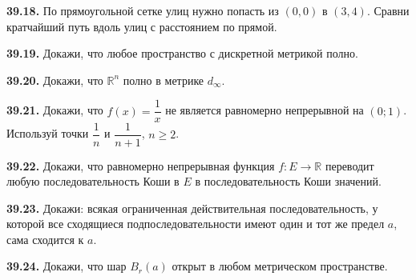 \noindent\begin{minipage}[t]{\linewidth}\textbf{39.18.} По прямоугольной сетке улиц нужно попасть из \((0,0)\) в \((3,4)\). Сравни кратчайший путь вдоль улиц с расстоянием по прямой.\par\end{minipage}\par
\noindent\begin{minipage}[t]{\linewidth}\textbf{39.19.}\starmark{} Докажи, что любое пространство с дискретной метрикой полно.\par\end{minipage}\par
\noindent\begin{minipage}[t]{\linewidth}\textbf{39.20.}\starmark{} Докажи, что \(\mathbb R^n\) полно в метрике \(d_\infty\).\par\end{minipage}\par
\noindent\begin{minipage}[t]{\linewidth}\textbf{39.21.}\starmark{} Докажи, что \(f(x)=\dfrac1x\) не является равномерно непрерывной на \((0;1)\). Используй точки \(\dfrac1n\) и \(\dfrac1{n+1}\), \(n\ge2\).\par\end{minipage}\par
\noindent\begin{minipage}[t]{\linewidth}\textbf{39.22.}\starmark{} Докажи, что равномерно непрерывная функция \(f:E\to\mathbb R\) переводит любую последовательность Коши в \(E\) в последовательность Коши значений.\par\end{minipage}\par
\noindent\begin{minipage}[t]{\linewidth}\textbf{39.23.}\starmark{} Докажи: всякая ограниченная действительная последовательность, у которой все сходящиеся подпоследовательности имеют один и тот же предел \(a\), сама сходится к \(a\).\par\end{minipage}\par
\noindent\begin{minipage}[t]{\linewidth}\textbf{39.24.} Докажи, что шар \(B_r(a)\) открыт в любом метрическом пространстве.\par\end{minipage}\par
\endgroup
